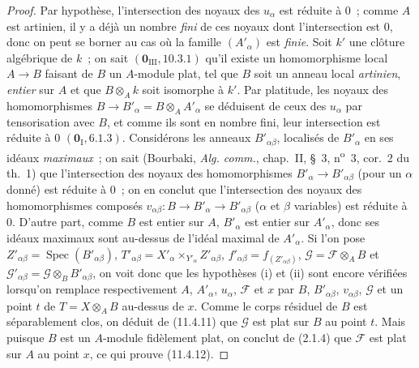 \begin{proof}
Par hypothèse, l'intersection des noyaux des $u_\alpha$ est réduite à $0$~;
comme $A$ est artinien, il y a déjà un nombre \emph{fini} de ces noyaux dont
l'intersection est $0$, donc on peut se borner au cas où la famille
$(A'_\alpha)$ est \emph{finie}. Soit $k'$ une clôture algébrique de $k$~; on sait
$(\mathbf 0_{\mathrm{III}},10.3.1)$ qu'il existe un homomorphisme local
$A\to B$ faisant de $B$ un $A$-module plat, tel que $B$ soit un anneau local
\emph{artinien}, \emph{entier} sur $A$ et que $B\otimes_A k$ soit isomorphe à $k'$.
Par platitude, les noyaux des homomorphismes
$B\to B'_\alpha=B\otimes_A A'_\alpha$ se déduisent de ceux des $u_\alpha$ par
tensorisation avec $B$, et comme ils sont en nombre fini, leur intersection est
réduite à $0$ $(\mathbf 0_{\mathrm I},6.1.3)$. Considérons les anneaux
$B'_{\alpha\beta}$, localisés de $B'_\alpha$ en ses idéaux \emph{maximaux}~; on sait
(Bourbaki, \emph{Alg. comm.}, chap.~II, \S~3, n\textsuperscript{o}~3, cor.~2 du th.~1)
que l'intersection des noyaux des homomorphismes
$B'_\alpha\to B'_{\alpha\beta}$ (pour un $\alpha$ donné) est réduite à $0$~;
on en conclut que l'intersection des noyaux des homomorphismes composés
$v_{\alpha\beta}:B\to B'_\alpha\to B'_{\alpha\beta}$ ($\alpha$ et $\beta$
variables) est réduite à $0$. D'autre part, comme $B$ est entier sur $A$,
$B'_\alpha$ est entier sur $A'_\alpha$, donc ses idéaux maximaux sont au-dessus
de l'idéal maximal de $A'_\alpha$. Si l'on pose
$Z'_{\alpha\beta}=\operatorname{Spec}(B'_{\alpha\beta})$,
$T'_{\alpha\beta}=X'_\alpha\times_{Y'_\alpha}Z'_{\alpha\beta}$,
$f'_{\alpha\beta}=f_{(Z'_{\alpha\beta})}$,
$\mathcal G=\mathcal F\otimes_A B$ et
$\mathcal G'_{\alpha\beta}=\mathcal G\otimes_B B'_{\alpha\beta}$, on voit donc
que les hypothèses (i) et (ii) sont encore vérifiées lorsqu'on remplace
respectivement $A$, $A'_\alpha$, $u_\alpha$, $\mathcal F$ et $x$ par $B$,
$B'_{\alpha\beta}$, $v_{\alpha\beta}$, $\mathcal G$ et un point $t$ de
$T=X\otimes_A B$ au-dessus de $x$. Comme le corps résiduel de $B$ est
séparablement clos, on déduit de (11.4.11) que $\mathcal G$ est plat sur $B$ au
point $t$. Mais puisque $B$ est un $A$-module fidèlement plat, on conclut de
(2.1.4) que $\mathcal F$ est plat sur $A$ au point $x$, ce qui prouve (11.4.12).
\end{proof}

